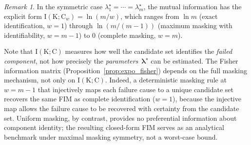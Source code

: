 \documentclass[12pt]{article}
\newcommand{\RV}[1]{\mathrm{#1}}
\newcommand{\cand}{\RV{C}}         %
\newcommand{\tparam}[1]{{#1}^{\star}}  %
\renewcommand{\vec}[1]{\boldsymbol{#1}}
\theoremstyle{definition}
\theoremstyle{remark}
\newtheorem{remark}[theorem]{Remark}
\begin{document}
\begin{remark}
In the symmetric case $\tparam{\lambda}_1 = \cdots = \tparam{\lambda}_m$, the mutual information has the explicit form $\RV{I}(\RV{K}; \cand_w) = \ln(m/w)$, which ranges from $\ln m$ (exact identification, $w=1$) through $\ln(m/(m-1))$ (maximum masking with identifiability, $w=m-1$) to $0$ (complete masking, $w=m$).

Note that $\RV{I}(\RV{K}; \cand)$ measures how well the candidate set identifies the \emph{failed component}, not how precisely the \emph{parameters}~$\tparam{\vec{\lambda}}$ can be estimated. The Fisher information matrix (Proposition~\ref{prop:expo_fisher}) depends on the full masking mechanism, not only on $\RV{I}(\RV{K}; \cand)$. Indeed, a deterministic masking rule at $w = m-1$ that injectively maps each failure cause to a unique candidate set recovers the same FIM as complete identification ($w = 1$), because the injective map allows the failure cause to be recovered with certainty from the candidate set. Uniform masking, by contrast, provides no preferential information about component identity; the resulting closed-form FIM serves as an analytical benchmark under maximal masking symmetry, not a worst-case bound.
\end{remark}
\end{document}
